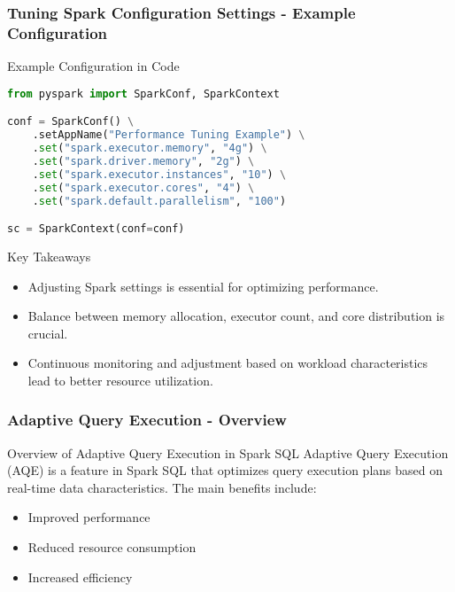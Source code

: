 \documentclass[aspectratio=169]{beamer}
\begin{document}
\begin{frame}[fragile]
    \frametitle{Tuning Spark Configuration Settings - Example Configuration}
    \begin{block}{Example Configuration in Code}
    \begin{lstlisting}[language=Python]
from pyspark import SparkConf, SparkContext

conf = SparkConf() \
    .setAppName("Performance Tuning Example") \
    .set("spark.executor.memory", "4g") \
    .set("spark.driver.memory", "2g") \
    .set("spark.executor.instances", "10") \
    .set("spark.executor.cores", "4") \
    .set("spark.default.parallelism", "100")

sc = SparkContext(conf=conf)
    \end{lstlisting}
    \end{block}
    
    \begin{block}{Key Takeaways}
        \begin{itemize}
            \item Adjusting Spark settings is essential for optimizing performance.
            \item Balance between memory allocation, executor count, and core distribution is crucial.
            \item Continuous monitoring and adjustment based on workload characteristics lead to better resource utilization.
        \end{itemize}
    \end{block}
\end{frame}

\begin{frame}[fragile]
    \frametitle{Adaptive Query Execution - Overview}
    \begin{block}{Overview of Adaptive Query Execution in Spark SQL}
        Adaptive Query Execution (AQE) is a feature in Spark SQL that optimizes query execution plans based on real-time data characteristics. 
        The main benefits include:
        \begin{itemize}
            \item Improved performance
            \item Reduced resource consumption
            \item Increased efficiency
        \end{itemize}
    \end{block}
\end{frame}
\end{document}
